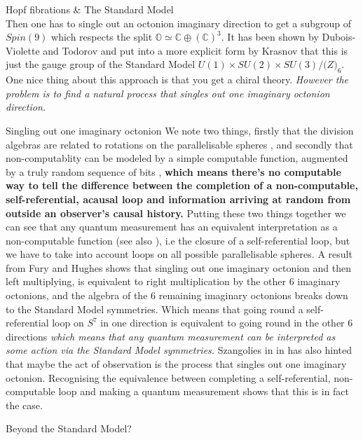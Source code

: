 \documentclass[final]{beamer}
\newlength{\colwidth}
\begin{document}
\begin{frame}[t]
\begin{columns}[t]
\begin{column}{\colwidth}
\begin{block}{Hopf fibrations \& The Standard Model}
\begin{equation}
\end{equation}
Then one has to single out an octonion imaginary direction to get a subgroup of $Spin(9)$ which respects the split $\mathbb{O} \simeq \mathbb{C} \oplus (\mathbb{C})^3$. It has been shown by Dubois-Violette and Todorov \autocite{Dubois_v_2018} and put into a more explicit form by Krasnov \autocite{Krasnov_k_2019} that this is just the gauge group of the Standard Model $U(1) \times SU(2) \times SU(3) / \mathbb(Z)_6$. One nice thing about this approach is that you get a chiral theory.  \emph{However the problem is to find a natural process that singles out one imaginary octonion direction.} 
\end{block}
\begin{block}{Singling out one imaginary octonion}
We note two things, firstly that the division algebras are related to rotations on the parallelisable spheres \autocite{baez_2002}, and secondly that non-computablity can be modeled by a simple computable function, augmented by a truly random sequence of bits \autocite{Tanner_Edis_98, calude_value_indefiniteness_2006}, \textbf{which means there's no computable way to tell the difference between the completion of a non-computable, self-referential, acausal loop and information arriving at random from outside an observer's causal history.} Putting these two things together we can see that any quantum measurement has an equivalent interpretation as a non-computable function (see also \cite{Penrose_ENM}), i.e the closure of a self-referential loop, but we have to take into account loops on all possible parallelisable spheres. A result from Fury and Hughes \autocite{Furey_n_hughes_m_2021, Furey2022DivisionBreaking} shows that singling out one imaginary octonion and then left multiplying, is equivalent to right multiplication by the other 6 imaginary octonions, and the algebra of the 6 remaining imaginary octonions breaks down to the Standard Model symmetries. Which means that going round a self-referential loop on $S^7$ in one direction is equivalent to going round in the other 6 directions \emph{which means that any quantum measurement can be interpreted as some action via the Standard Model symmetries.}  Szangolies in in \autocite{Szangolies_J_not_yet_published} has also hinted that maybe the act of observation is the process that singles out one imaginary octonion. Recognising the equivalence between completing a self-referential, non-computable loop and making a quantum measurement shows that this is in fact the case.
\end{block}
\begin{block}{Beyond the Standard Model?}

\end{block}
\end{column}
\end{columns}
\end{frame}
\end{document}
